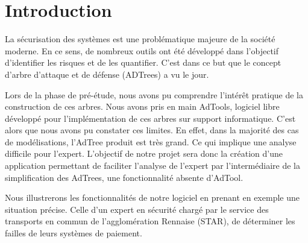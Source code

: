 \section{Introduction}
	
	La sécurisation des systèmes est une problématique majeure de la société moderne. En ce sens, de nombreux outils ont été développé dans l'objectif d'identifier les risques et de les quantifier. C'est dans ce but que le concept d'arbre d'attaque et de défense (ADTrees) a vu le jour. 
	
	Lors de la phase de pré-étude, nous avons pu comprendre l’intérêt pratique de la construction de ces arbres. Nous avons pris en main AdTools, logiciel libre développé pour l'implémentation de ces arbres sur support informatique. C'est alors que nous avons pu constater ces limites. En effet, dans la majorité des cas de modélisations, l'AdTree produit est très grand. Ce qui implique une analyse difficile pour l'expert. L'objectif de notre projet sera donc la création d'une application permettant de faciliter l'analyse de l'expert par l’intermédiaire de la simplification des AdTrees, une fonctionnalité absente d'AdTool.

	Nous illustrerons les fonctionnalités de notre logiciel en prenant en exemple une situation précise. Celle d'un expert en sécurité chargé par le service des transports en commun de l'agglomération Rennaise (STAR), de déterminer les failles de leurs systèmes de paiement. 













